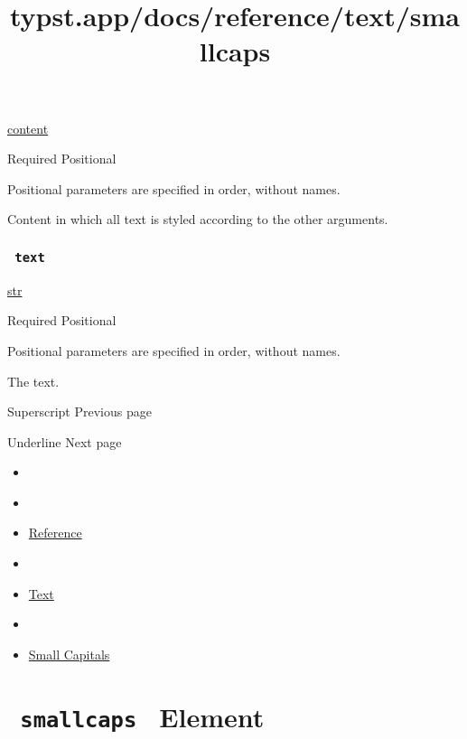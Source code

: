 \href{/docs/reference/foundations/content/}{content}

{Required} {{ Positional }}

\label{parameters-body-positional-tooltip}
Positional parameters are specified in order, without names.

Content in which all text is styled according to the other arguments.

\subsubsection{\texorpdfstring{\texttt{\ text\ }}{ text }}\label{parameters-text}

\href{/docs/reference/foundations/str/}{str}

{Required} {{ Positional }}

\label{parameters-text-positional-tooltip}
Positional parameters are specified in order, without names.

The text.

\href{/docs/reference/text/super/}{\pandocbounded{}}

{ Superscript } { Previous page }

\href{/docs/reference/text/underline/}{\pandocbounded{}}

{ Underline } { Next page }


\title{typst.app/docs/reference/text/smallcaps}

\begin{itemize}
\tightlist
\item
  \href{/docs}{}
\item
  
\item
  \href{/docs/reference/}{Reference}
\item
  
\item
  \href{/docs/reference/text/}{Text}
\item
  
\item
  \href{/docs/reference/text/smallcaps/}{Small Capitals}
\end{itemize}

\section{\texorpdfstring{\texttt{\ smallcaps\ } {{ Element
}}}{ smallcaps   Element }}\label{summary}

